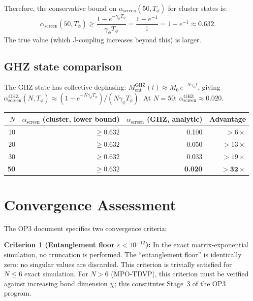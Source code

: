 \documentclass[11pt,letterpaper]{article}
\newcommand{\asc}{\alpha_{\mathrm{screen}}}
\newcommand{\Tp}{T_\phi}
\begin{document}
Therefore, the conservative bound on $\asc(50, \Tp)$ for cluster states is:
\begin{equation}
  \asc(50, \Tp) \geq \frac{1 - e^{-\gamma_\phi\Tp}}{\gamma_\phi\Tp}
  = \frac{1 - e^{-1}}{1} = 1 - e^{-1} \approx 0.632.
  \label{eq:bound}
\end{equation}
The true value (which J-coupling increases beyond this) is larger.

\subsection{GHZ state comparison}

The GHZ state has collective dephasing: $M_{\mathrm{ent}}^{\mathrm{GHZ}}(t)
\approx M_0\,e^{-N\gamma_\phi t}$, giving
$\asc^{\mathrm{GHZ}}(N,\Tp) \approx (1 - e^{-N\gamma_\phi\Tp})/(N\gamma_\phi\Tp)$.
At $N = 50$: $\asc^{\mathrm{GHZ}} \approx 0.020$.

\begin{center}\small
\begin{tabular}{@{}rrrr@{}}
\toprule
$N$ & $\asc$ (cluster, lower bound) & $\asc$ (GHZ, analytic) & Advantage \\
\midrule
10 & $\geq 0.632$ & 0.100 & $>6\times$ \\
20 & $\geq 0.632$ & 0.050 & $>13\times$ \\
30 & $\geq 0.632$ & 0.033 & $>19\times$ \\
\textbf{50} & $\boldsymbol{\geq 0.632}$ & \textbf{0.020} & $>\mathbf{32\times}$ \\
\bottomrule
\end{tabular}
\end{center}

\section{Convergence Assessment}

The OP3 document specifies two convergence criteria:

\textbf{Criterion 1 (Entanglement floor $\varepsilon < 10^{-12}$):}  In the
exact matrix-exponential simulation, no truncation is performed.  The ``entanglement
floor'' is identically zero: no singular values are discarded.  This criterion is
trivially satisfied for $N \leq 6$ exact simulation.  For $N > 6$ (MPO-TDVP), this
criterion must be verified against increasing bond dimension $\chi$; this
constitutes Stage~3 of the OP3 program.
\end{document}
